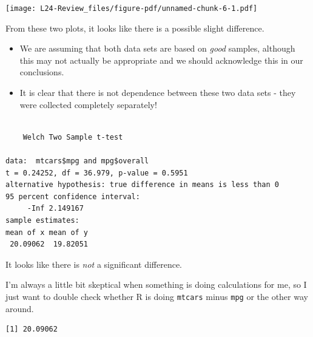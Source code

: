 \documentclass[
  letterpaper,
  DIV=11,
  numbers=noendperiod,
  oneside]{scrreprt}
\newenvironment{Shaded}{\begin{snugshade}}{\end{snugshade}}
\newcommand{\AttributeTok}[1]{\textcolor[rgb]{0.40,0.45,0.13}{#1}}
\newcommand{\FunctionTok}[1]{\textcolor[rgb]{0.28,0.35,0.67}{#1}}
\newcommand{\NormalTok}[1]{\textcolor[rgb]{0.00,0.23,0.31}{#1}}
\newcommand{\SpecialCharTok}[1]{\textcolor[rgb]{0.37,0.37,0.37}{#1}}
\newcommand{\StringTok}[1]{\textcolor[rgb]{0.13,0.47,0.30}{#1}}
\providecommand{\tightlist}{%
  \setlength{\itemsep}{0pt}\setlength{\parskip}{0pt}}\usepackage{longtable,booktabs,array}
\begin{document}
\texttt{[image: L24-Review\_files/figure-pdf/unnamed-chunk-6-1.pdf]}

From these two plots, it looks like there is a possible slight
difference.

\begin{itemize}
\tightlist
\item
  We are assuming that both data sets are based on \emph{good} samples,
  although this may not actually be appropriate and we should
  acknowledge this in our conclusions.
\item
  It is clear that there is not dependence between these two data sets -
  they were collected completely separately!
\end{itemize}

\begin{Shaded}
\end{Shaded}

\begin{verbatim}

    Welch Two Sample t-test

data:  mtcars$mpg and mpg$overall
t = 0.24252, df = 36.979, p-value = 0.5951
alternative hypothesis: true difference in means is less than 0
95 percent confidence interval:
     -Inf 2.149167
sample estimates:
mean of x mean of y 
 20.09062  19.82051 
\end{verbatim}

It looks like there is \emph{not} a significant difference.

I'm always a little bit skeptical when something is doing calculations
for me, so I just want to double check whether R is doing
\texttt{mtcars} minus \texttt{mpg} or the other way around.

\begin{Shaded}
\end{Shaded}

\begin{verbatim}
[1] 20.09062
\end{verbatim}
\end{document}

